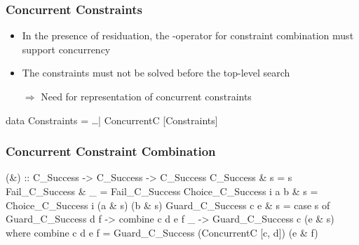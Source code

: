 \documentclass[
,xcolor=dvipsnames
]{beamer}
\newcommand{\ergo}{$\Rightarrow$}
\begin{document}
\begin{frame}[fragile]%
\frametitle{Concurrent Constraints}

\begin{itemize}
\item In the presence of residuation, the \code{(\&)}-operator
      for constraint combination must support concurrency
\item The constraints must not be solved before the top-level search
\item[\ergo] Need for representation of concurrent constraints
\end{itemize}


\begin{haskell}
data Constraints = \ldots \alert{| ConcurrentC [Constraints]}
\end{haskell}
\end{frame}

\begin{frame}[fragile]%
\frametitle{Concurrent Constraint Combination}

\begin{haskell}
(\&) :: C_Success -> C_Success -> C_Success
C_Success              \& s = s
Fail_C_Success         \& _ = Fail_C_Success
Choice_C_Success i a b \& s = Choice_C_Success i (a \& s) (b \& s)
Guard_C_Success c e    \& s = case s of
  Guard_C_Success d f -> \alert{combine c d e f}
  _                   -> Guard_C_Success c (e \& s)
  where
  \alert{combine c d e f = Guard_C_Success (ConcurrentC [c, d]) (e \& f)}
\end{haskell}
\end{frame}
\end{document}
